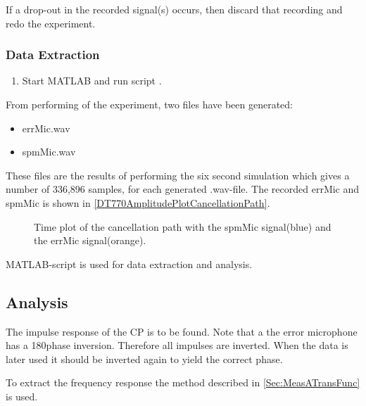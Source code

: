 If a drop-out in the recorded signal(s) occurs, then discard that recording and redo the experiment.


\subsubsection{Data Extraction}
\begin{enumerate}
	\item Start MATLAB\textsuperscript{\textregistered} and run script .
\end{enumerate}
From performing of the experiment, two files have been generated:
\begin{itemize}
	\item errMic.wav 
	\item spmMic.wav
\end{itemize}

These files are the results of performing the six second simulation which gives a number of 336,896 samples, for each generated .wav-file.
The recorded errMic and spmMic is shown in  \autoref{DT770AmplitudePlotCancellationPath}.

\begin{figure}[H]
	\centering
	
	\caption{Time plot of the cancellation path with the spmMic signal(blue) and the errMic signal(orange).}
	\label{DT770AmplitudePlotCancellationPath}
\end{figure}

MATLAB\textsuperscript{\textregistered}-script  is used for data extraction and analysis.



\subsection{Analysis}
The impulse response of the CP is to be found.
Note that a the error microphone has a 180\textdegree phase inversion. Therefore all impulses are inverted. When the data is later used it should be inverted again to yield the correct phase. \cite{michandbook}

To extract the frequency response the method described in \autoref{Sec:MeasATransFunc} is used.

